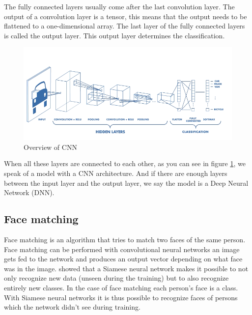 The fully connected layers usually come after the last convolution layer. The output of a convolution layer is a tensor, this means that the output needs to be flattened to a one-dimensional array. The last layer of the fully connected layers is called the output layer. This output layer determines the classification.

\begin{figure}[H]
  \includegraphics[width=\linewidth]{fig/cnn.png}
  \caption{Overview of CNN}
  \label{fig:cnn}
\end{figure}

When all these layers are connected to each other, as you can see in figure \ref{fig:cnn}, we speak of a model with a CNN architecture. And if there are enough layers between the input layer and the output layer, we say the model is a Deep Neural Network (DNN).

\subsection{Face matching}
Face matching is an algorithm that tries to match two faces of the same person. Face matching can be performed with convolutional neural networks an image gets fed to the network and produces an output vector depending on what face was in the image. \cite{koch2015siamese} showed that a Siamese neural network makes it possible to not only recognize new data (unseen during the training) but to also recognize entirely new classes. In the case of face matching each person's face is a class. With Siamese neural networks it is thus possible to recognize faces of persons which the network didn't see during training.

